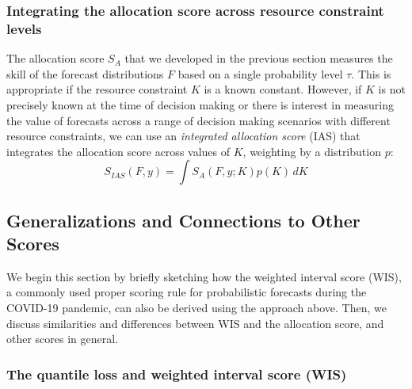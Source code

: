 \documentclass{article}\usepackage[]{graphicx}\usepackage[]{xcolor}
\begin{document}
\subsubsection{Integrating the allocation score across resource constraint levels}
\label{sec:methods.detailed.integrated_allocation}

The allocation score $S_A$ that we developed in the previous section measures the skill of the forecast distributions $F$ based on a single probability level $\tau$. This is appropriate if the resource constraint $K$ is a known constant. However, if $K$ is not precisely known at the time of decision making or there is interest in measuring the value of forecasts across a range of decision making scenarios with different resource constraints, we can use an \emph{integrated allocation score} (IAS) that integrates the allocation score across values of $K$, weighting by a distribution $p$:
$$S_{IAS}(F, y) = \int S_A(F,y; K) p(K) \, dK$$


\subsection{Generalizations and Connections to Other Scores}
\label{sec:methods.related}

We begin this section by briefly sketching how the weighted interval score (WIS), a commonly used proper scoring rule for probabilistic forecasts during the COVID-19 pandemic, can also be derived using the approach above. Then, we discuss similarities and differences between WIS and the allocation score, and other scores in general.

\subsubsection{The quantile loss and weighted interval score (WIS)}
\label{sec:methods.wis}
\end{document}
